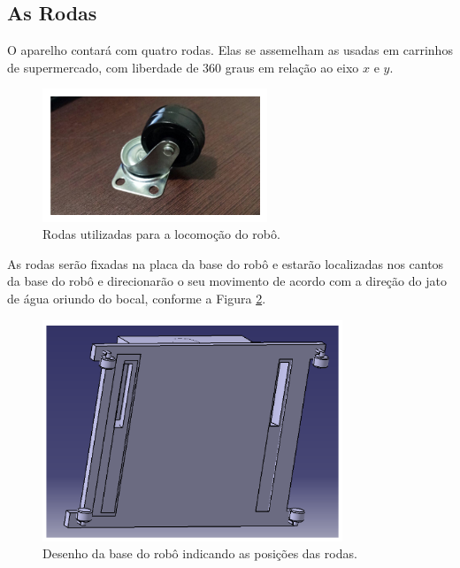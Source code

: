 \subsection{As Rodas}
O aparelho contará com quatro rodas. Elas se assemelham as usadas em carrinhos de supermercado, com liberdade de 360 graus em relação ao eixo $x$ e $y$.
\par
  \begin{figure}[h]
    \centering
    \includegraphics[width=0.6\textwidth]{figures/wheel-market.png}
    \caption{Rodas utilizadas para a locomoção do robô.}
    \label{fig:wheel-market}
  \end{figure}
  \FloatBarrier
\par
As rodas serão fixadas na placa da base do robô e estarão localizadas nos cantos da base do robô e direcionarão o seu movimento de acordo com a direção do jato de água oriundo do bocal, conforme a Figura \ref{fig:catia-base}.
\par
  \begin{figure}[h]
    \centering
    \includegraphics[width=0.8\textwidth]{figures/catia-base.png}
    \caption{Desenho da base do robô indicando as posições das rodas.}
    \label{fig:catia-base}
  \end{figure}
  \FloatBarrier
\par


